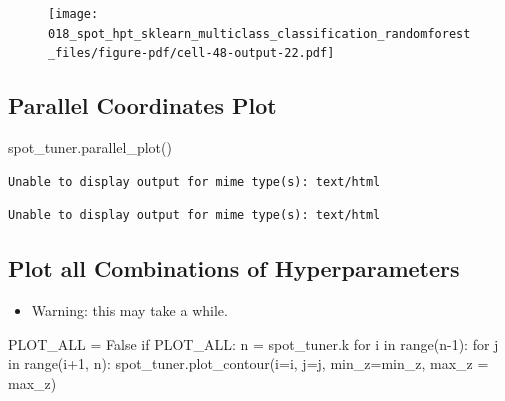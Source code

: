 \documentclass[
  letterpaper,
  DIV=11,
  numbers=noendperiod]{scrreprt}
\newenvironment{Shaded}{\begin{snugshade}}{\end{snugshade}}
\newcommand{\BuiltInTok}[1]{\textcolor[rgb]{0.00,0.23,0.31}{#1}}
\newcommand{\ControlFlowTok}[1]{\textcolor[rgb]{0.00,0.23,0.31}{#1}}
\newcommand{\DecValTok}[1]{\textcolor[rgb]{0.68,0.00,0.00}{#1}}
\newcommand{\KeywordTok}[1]{\textcolor[rgb]{0.00,0.23,0.31}{#1}}
\newcommand{\NormalTok}[1]{\textcolor[rgb]{0.00,0.23,0.31}{#1}}
\newcommand{\OperatorTok}[1]{\textcolor[rgb]{0.37,0.37,0.37}{#1}}
\newcommand{\VariableTok}[1]{\textcolor[rgb]{0.07,0.07,0.07}{#1}}
\providecommand{\tightlist}{%
  \setlength{\itemsep}{0pt}\setlength{\parskip}{0pt}}\usepackage{longtable,booktabs,array}
\begin{document}
\begin{figure}[H]

{\centering \texttt{[image: 018\_spot\_hpt\_sklearn\_multiclass\_classification\_randomforest\_files/figure-pdf/cell-48-output-22.pdf]}

}

\end{figure}

\hypertarget{parallel-coordinates-plot-1}{%
\subsection{Parallel Coordinates
Plot}\label{parallel-coordinates-plot-1}}

\begin{Shaded}
\begin{Highlighting}[]
\NormalTok{spot\_tuner.parallel\_plot()}
\end{Highlighting}
\end{Shaded}

\begin{verbatim}
Unable to display output for mime type(s): text/html
\end{verbatim}

\begin{verbatim}
Unable to display output for mime type(s): text/html
\end{verbatim}

\hypertarget{plot-all-combinations-of-hyperparameters-1}{%
\subsection{Plot all Combinations of
Hyperparameters}\label{plot-all-combinations-of-hyperparameters-1}}

\begin{itemize}
\tightlist
\item
  Warning: this may take a while.
\end{itemize}

\begin{Shaded}
\begin{Highlighting}[]
\NormalTok{PLOT\_ALL }\OperatorTok{=} \VariableTok{False}
\ControlFlowTok{if}\NormalTok{ PLOT\_ALL:}
\NormalTok{    n }\OperatorTok{=}\NormalTok{ spot\_tuner.k}
    \ControlFlowTok{for}\NormalTok{ i }\KeywordTok{in} \BuiltInTok{range}\NormalTok{(n}\OperatorTok{{-}}\DecValTok{1}\NormalTok{):}
        \ControlFlowTok{for}\NormalTok{ j }\KeywordTok{in} \BuiltInTok{range}\NormalTok{(i}\OperatorTok{+}\DecValTok{1}\NormalTok{, n):}
\NormalTok{            spot\_tuner.plot\_contour(i}\OperatorTok{=}\NormalTok{i, j}\OperatorTok{=}\NormalTok{j, min\_z}\OperatorTok{=}\NormalTok{min\_z, max\_z }\OperatorTok{=}\NormalTok{ max\_z)}
\end{Highlighting}
\end{Shaded}
\end{document}

